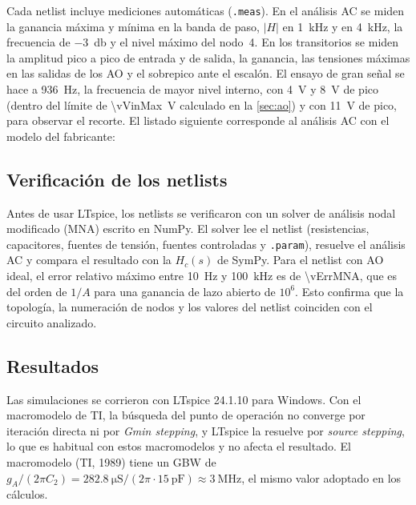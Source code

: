 Cada netlist incluye mediciones automáticas (\texttt{.meas}). En el análisis AC se miden la ganancia máxima y mínima en la banda de paso, $|H|$ en
\qty{1}{\kilo\hertz} y en \qty{4}{\kilo\hertz}, la frecuencia de \qty{-3}{\decibel} y el nivel máximo del nodo~4. En los transitorios se miden la
amplitud pico a pico de entrada y de salida, la ganancia, las tensiones máximas en las salidas de los AO y el sobrepico ante el escalón. El ensayo de
gran señal se hace a \qty{936}{\hertz}, la frecuencia de mayor nivel interno, con \qty{4}{\volt} y \qty{8}{\volt} de pico (dentro del límite de
\qty{\vVinMax}{\volt} calculado en la \cref{sec:ao}) y con \qty{11}{\volt} de pico, para observar el recorte. El listado siguiente corresponde al
análisis AC con el modelo del fabricante:


\subsection{Verificación de los netlists}
Antes de usar LTspice, los netlists se verificaron con un solver de análisis nodal modificado (MNA) escrito en NumPy. El solver lee el netlist
(resistencias, capacitores, fuentes de tensión, fuentes controladas y \texttt{.param}), resuelve el análisis AC y compara el resultado con la
$H_c(s)$ de SymPy. Para el netlist con AO ideal, el error relativo máximo entre \qty{10}{\hertz} y \qty{100}{\kilo\hertz} es de
\num{\vErrMNA}, que es del orden de $1/A$ para una ganancia de lazo abierto de $10^6$. Esto confirma que la topología, la numeración de nodos y los
valores del netlist coinciden con el circuito analizado.

\subsection{Resultados}
Las simulaciones se corrieron con LTspice 24.1.10 para Windows. Con el macromodelo de TI, la búsqueda del punto de operación no converge por
iteración directa ni por \emph{Gmin stepping}, y LTspice la resuelve por \emph{source stepping}, lo que es habitual con estos macromodelos y no
afecta el resultado. El macromodelo (TI, 1989) tiene un GBW de $g_A/(2\pi C_2) = \qty{282.8}{\micro\siemens}/(2\pi\cdot\qty{15}{\pico\farad})
\approx \qty{3}{\mega\hertz}$, el mismo valor adoptado en los cálculos.

